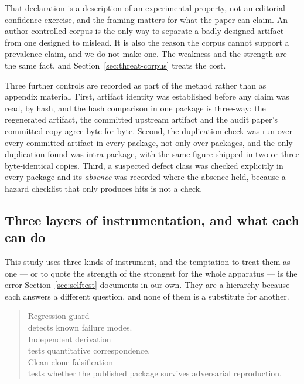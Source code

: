 \documentclass[sigconf,review]{acmart}
\begin{document}
That declaration is a description of an experimental property, not an
editorial confidence exercise, and the framing matters for what the paper can
claim. An author-controlled corpus is the only way to separate a badly
designed artifact from one designed to mislead. It is also the reason the
corpus cannot support a prevalence claim, and we do not make one. The weakness
and the strength are the same fact, and Section~\ref{sec:threat-corpus}
treats the cost.

Three further controls are recorded as part of the method rather than as
appendix material. First, artifact identity was established before any claim
was read, by hash, and the hash comparison in one package is three-way: the
regenerated artifact, the committed upstream artifact and the audit paper's
committed copy agree byte-for-byte. Second, the duplication check was run over
every committed artifact in every package, not only over packages, and the
only duplication found was intra-package, with the same figure shipped in two
or three byte-identical copies. Third, a suspected defect class was checked
explicitly in every package and its \emph{absence} was recorded where the
absence held, because a hazard checklist that only produces hits is not a
check.

\subsection{Three layers of instrumentation, and what each can do}
\label{sec:method-instruments}

This study uses three kinds of instrument, and the temptation to treat them as
one --- or to quote the strength of the strongest for the whole apparatus ---
is the error Section~\ref{sec:selftest} documents in our own. They are a
hierarchy because each answers a different question, and none of them is a
substitute for another.

\begin{quote}
\ttfamily
Regression guard\\
\hspace*{1.5em}detects known failure modes.\\[0.6em]
Independent derivation\\
\hspace*{1.5em}tests quantitative correspondence.\\[0.6em]
Clean-clone falsification\\
\hspace*{1.5em}tests whether the published package survives adversarial reproduction.
\end{quote}
\end{document}
